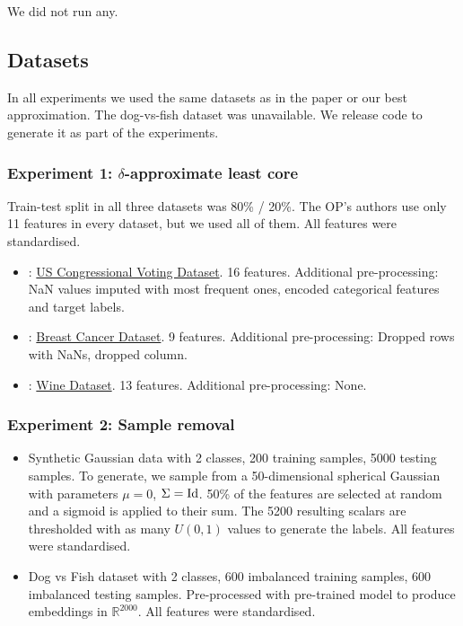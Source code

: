 We did not run any.

\subsection{Datasets}

In all experiments we used the same datasets as in the paper or our best
approximation. The dog-vs-fish dataset was unavailable. We release code to
generate it as part of the experiments.

\subsubsection{Experiment 1: $\delta$-approximate least core}

Train-test split in all three datasets was 80\% / 20\%. The OP's authors use
only 11 features in every dataset, but we used all of them. All features were
standardised.
\begin{itemize}
  \item {}:
  \href{https://www.openml.org/search?type=data&status=active&id=56}{US
  Congressional Voting Dataset}. 16 features. Additional pre-processing: NaN
  values imputed with most frequent ones, encoded categorical features and
  target labels.
  
  \item {}:
  \href{https://www.openml.org/search?type=data&status=active&id=43611}{Breast
  Cancer Dataset}. 9 features. Additional pre-processing: Dropped rows with
  NaNs, dropped {} column.
  
  \item {}:
  \href{https://scikit-learn.org/stable/modules/generated/sklearn.datasets.load\_wine.html}{Wine
  Dataset}. 13 features. Additional pre-processing: None.
\end{itemize}

\subsubsection{Experiment 2: Sample removal}

\begin{itemize}
  \item Synthetic Gaussian data with 2 classes, 200 training samples, 5000
  testing samples. To generate, we sample from a 50-dimensional spherical
  Gaussian with parameters $\mu = 0$, $\Sigma = \operatorname{Id}$. 50\% of the
  features are selected at random and a sigmoid is applied to their sum. The
  5200 resulting scalars are thresholded with as many $U (0, 1)$ values to
  generate the labels. All features were standardised.
  
  \item Dog vs Fish dataset with 2 classes, 600 imbalanced training samples,
  600 imbalanced testing samples. Pre-processed with pre-trained
  {} model to produce embeddings in $\mathbb{R}^{2000}$.
  All features were standardised.
\end{itemize}
